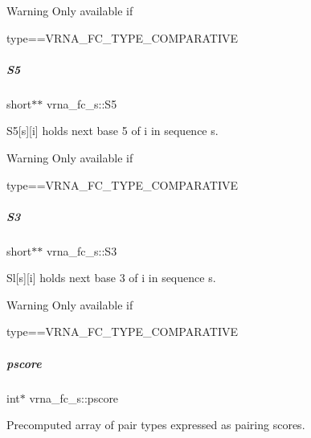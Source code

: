 \begin{DoxyWarning}{Warning}
Only available if\begin{DoxyVerb}type==VRNA_FC_TYPE_COMPARATIVE \end{DoxyVerb}
 
\end{DoxyWarning}
\mbox{\label{group__fold__compound_a78d089b475e2230bd536b9a6ed8bb17c}} 
\subparagraph{\texorpdfstring{S5}{S5}}
{\footnotesize\ttfamily short$\ast$$\ast$ vrna\+\_\+fc\+\_\+s\+::\+S5}



S5\mbox{[}s\mbox{]}\mbox{[}i\mbox{]} holds next base 5\textquotesingle{} of i in sequence s. 

\begin{DoxyWarning}{Warning}
Only available if\begin{DoxyVerb}type==VRNA_FC_TYPE_COMPARATIVE \end{DoxyVerb}
 
\end{DoxyWarning}
\mbox{\label{group__fold__compound_af6ab2a25b84d2308ee23f6b11b5fd52d}} 
\subparagraph{\texorpdfstring{S3}{S3}}
{\footnotesize\ttfamily short$\ast$$\ast$ vrna\+\_\+fc\+\_\+s\+::\+S3}



Sl\mbox{[}s\mbox{]}\mbox{[}i\mbox{]} holds next base 3\textquotesingle{} of i in sequence s. 

\begin{DoxyWarning}{Warning}
Only available if\begin{DoxyVerb}type==VRNA_FC_TYPE_COMPARATIVE \end{DoxyVerb}
 
\end{DoxyWarning}
\mbox{\label{group__fold__compound_a14dc7755af6019ddbd0cf94b209e89dd}} 
\subparagraph{\texorpdfstring{pscore}{pscore}}
{\footnotesize\ttfamily int$\ast$ vrna\+\_\+fc\+\_\+s\+::pscore}



Precomputed array of pair types expressed as pairing scores. 

